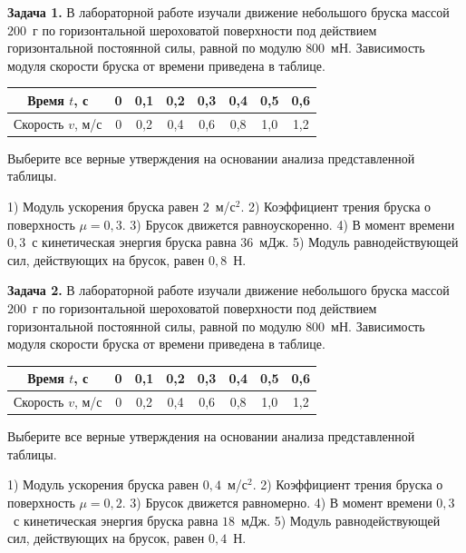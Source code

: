 
\begin{taskbasic}[code={\label{task:friction_v3_n5}}]
\textbf{Задача 1.} В лабораторной работе изучали движение небольшого бруска массой $200$~г по горизонтальной шероховатой поверхности под действием горизонтальной постоянной силы, равной по модулю $800$~мН. Зависимость модуля скорости бруска от времени приведена в таблице.
\begin{center}
\begin{tabular}{|c|c|c|c|c|c|c|c|}
\hline
Время $t$, с & 0 & 0,1 & 0,2 & 0,3 & 0,4 & 0,5 & 0,6 \\ \hline
Скорость $v$, м/с & 0 & 0,2 & 0,4 & 0,6 & 0,8 & 1,0 & 1,2 \\ \hline
\end{tabular}
\end{center}
Выберите все верные утверждения на основании анализа представленной таблицы.

1) Модуль ускорения бруска равен $2$~м/с$^{2}$.
2) Коэффициент трения бруска о поверхность $\mu = 0{,}3$.
3) Брусок движется равноускоренно.
4) В момент времени $0{,}3$~с кинетическая энергия бруска равна $36$~мДж.
5) Модуль равнодействующей сил, действующих на брусок, равен $0{,}8$~Н.

\end{taskbasic}

\begin{taskbasic}[code={\label{task:friction_v4_n5}}]
\textbf{Задача 2.} В лабораторной работе изучали движение небольшого бруска массой $200$~г по горизонтальной шероховатой поверхности под действием горизонтальной постоянной силы, равной по модулю $800$~мН. Зависимость модуля скорости бруска от времени приведена в таблице.
\begin{center}
\begin{tabular}{|c|c|c|c|c|c|c|c|}
\hline
Время $t$, с & 0 & 0,1 & 0,2 & 0,3 & 0,4 & 0,5 & 0,6 \\ \hline
Скорость $v$, м/с & 0 & 0,2 & 0,4 & 0,6 & 0,8 & 1,0 & 1,2 \\ \hline
\end{tabular}
\end{center}
Выберите все верные утверждения на основании анализа представленной таблицы.

1) Модуль ускорения бруска равен $0{,}4$~м/с$^{2}$.
2) Коэффициент трения бруска о поверхность $\mu = 0{,}2$.
3) Брусок движется равномерно.
4) В момент времени $0{,}3$~с кинетическая энергия бруска равна $18$~мДж.
5) Модуль равнодействующей сил, действующих на брусок, равен $0{,}4$~Н.

\end{taskbasic}


